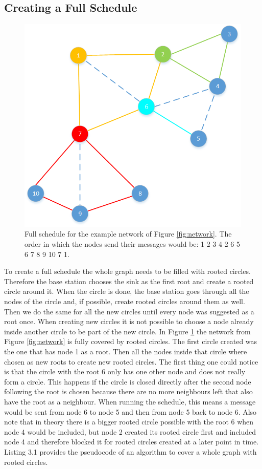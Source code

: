 \subsection{Creating a Full Schedule}
\begin{figure}[htbp]
	\centering         
    \includegraphics[scale=0.6]{content/images/Schedule/FullSchedule}
    \caption{Full schedule for the example network of Figure \ref{fig:network}. The order in which the nodes send their messages would be: 1 2 3 4 2 6 5 6 7 8 9 10 7 1.}
    \label{fig:schedule}
\end{figure} 
To create a full schedule the whole graph needs to be filled with rooted circles. Therefore the base station chooses the sink as the first root and create a rooted circle around it. When the circle is done, the base station goes through all the nodes of the circle and, if possible, create rooted circles around them as well. Then we do the same for all the new circles until every node was suggested as a root once. When creating new circles it is not possible to choose a node already inside another circle to be part of the new circle. In Figure \ref{fig:schedule} the network from Figure \ref{fig:network} is fully covered by rooted circles. The first circle created was the one that has node 1 as a root. Then all the nodes inside that circle where chosen as new roots to create new rooted circles. The first thing one could notice is that the circle with the root 6 only has one other node and does not really form a circle. This happens if the circle is closed directly after the second node following the root is chosen because there are no more neighbours left that also have the root as a neighbour. When running the schedule, this means a message would be sent from node 6 to node 5 and then from node 5 back to node 6. Also note that in theory there is a bigger rooted circle possible with the root 6 when node 4 would be included, but node 2 created its rooted circle first and included node 4 and therefore blocked it for rooted circles created at a later point in time. Listing 3.1 provides the pseudocode of an algorithm to cover a whole graph with rooted circles.

